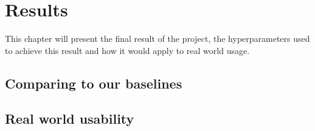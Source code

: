 \chapter{Results}\label{chap:results}
This chapter will present the final result of the project, the hyperparameters used to achieve this result and how it would apply to real world usage.
\section{Comparing to our baselines}
\section{Real world usability}